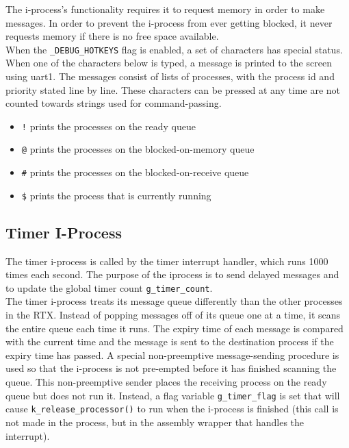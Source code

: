 \documentclass[12pt]{report}
\begin{document}
The i-process's functionality requires it to request memory in order to make messages. In order to prevent the i-process from ever getting blocked, it never requests memory if there is no free space available.\\

When the {\tt \_DEBUG\_HOTKEYS} flag is enabled, a set of characters has special status. When one of the characters below is typed, a message is printed to the screen using uart1. The messages consist of lists of processes, with the process id and priority stated line by line. These characters can be pressed at any time are not counted towards strings used for command-passing.

\begin{itemize}

\item {\tt !} prints the processes on the ready queue
\item {\tt @} prints the processes on the blocked-on-memory queue
\item {\tt \#} prints the processes on the blocked-on-receive queue
\item {\tt \$} prints the process that is currently running

\end{itemize}


\subsection{Timer I-Process}

The timer i-process is called by the timer interrupt handler, which runs 1000 times each second. The purpose of the iprocess is to send delayed messages and to update the global timer count {\tt g\_timer\_count}.\\

The timer i-process treats its message queue differently than the other processes in the RTX. Instead of popping messages off of its queue one at a time, it scans the entire queue each time it runs. The expiry time of each message is compared with the current time and the message is sent to the destination process if the expiry time has passed. A special non-preemptive message-sending procedure is used so that the i-process is not pre-empted before it has finished scanning the queue. This non-preemptive sender places the receiving process on the ready queue but does not run it. Instead, a flag variable {\tt g\_timer\_flag} is set that will cause {\tt k\_release\_processor()} to run when the i-process is finished (this call is not made in the process, but in the assembly wrapper that handles the interrupt).\\
\end{document}
